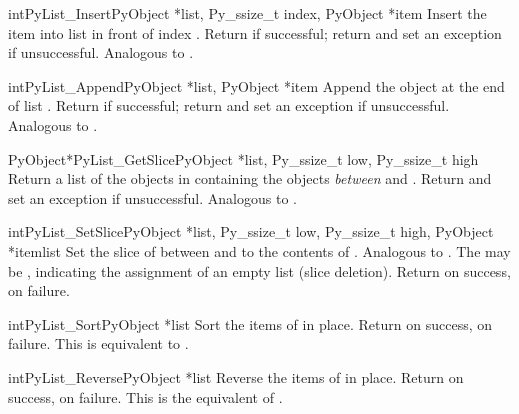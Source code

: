 \begin{cfuncdesc}{int}{PyList_Insert}{PyObject *list, Py_ssize_t index,
                                      PyObject *item}
  Insert the item  into list  in front of index
  .  Return  if successful; return  and
  set an exception if unsuccessful.  Analogous to
  .
\end{cfuncdesc}

\begin{cfuncdesc}{int}{PyList_Append}{PyObject *list, PyObject *item}
  Append the object  at the end of list .
  Return  if successful; return  and set an
  exception if unsuccessful.  Analogous to
  .
\end{cfuncdesc}

\begin{cfuncdesc}{PyObject*}{PyList_GetSlice}{PyObject *list,
                                              Py_ssize_t low, Py_ssize_t high}
  Return a list of the objects in  containing the objects
  \emph{between}  and .  Return \NULL{} and set
  an exception if unsuccessful.
  Analogous to .
\end{cfuncdesc}

\begin{cfuncdesc}{int}{PyList_SetSlice}{PyObject *list,
                                        Py_ssize_t low, Py_ssize_t high,
                                        PyObject *itemlist}
  Set the slice of  between  and  to the
  contents of .  Analogous to
  .
  The  may be \NULL{}, indicating the assignment
  of an empty list (slice deletion).
  Return  on success,  on failure.
\end{cfuncdesc}

\begin{cfuncdesc}{int}{PyList_Sort}{PyObject *list}
  Sort the items of  in place.  Return  on
  success,  on failure.  This is equivalent to
  .
\end{cfuncdesc}

\begin{cfuncdesc}{int}{PyList_Reverse}{PyObject *list}
  Reverse the items of  in place.  Return  on
  success,  on failure.  This is the equivalent of
  .
\end{cfuncdesc}

